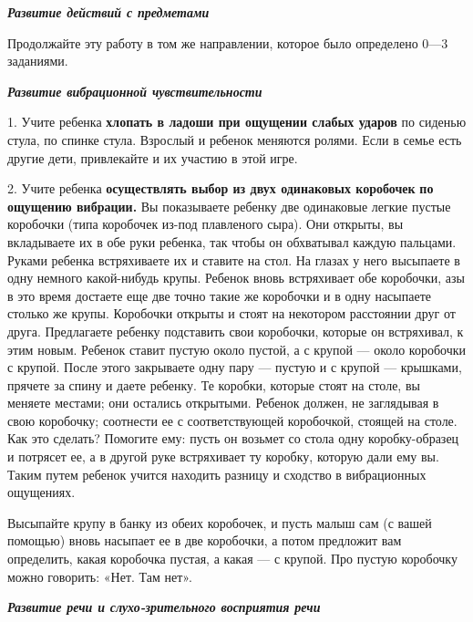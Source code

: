 \documentclass[a5paper]{book}
\renewcommand{\emph}[1]{\textit{#1}}
\begin{document}
\emph{\textbf{Развитие действий с предметами}}

Продолжайте эту работу в том же направлении, которое было определено
0---3 заданиями.

\textbf{\emph{Развитие вибрационной чувствительности}}

1. Учите ребенка \textbf{хлопать в ладоши при ощущении слабых ударов} по
сиденью стула, по спинке стула. Взрослый и ребенок меняются ролями. Если
в семье есть другие дети, привлекайте и их участию в этой игре.

2. Учите ребенка \textbf{осуществлять выбор из двух одинаковых
коробочек} \textbf{по ощущению вибрации.} Вы показываете ребенку две
одинаковые легкие пустые коробочки (типа коробочек из-под плавленого
сыра). Они открыты, вы вкладываете их в обе руки ребенка, так чтобы он
обхватывал каждую пальцами. Руками ребенка встряхиваете их и ставите на
стол. На глазах у него высыпаете в одну немного какой-нибудь крупы.
Ребенок вновь встряхивает обе коробочки, азы в это время достаете еще
две точно такие же коробочки и в одну насыпаете столько же крупы.
Коробочки открыты и стоят на некотором расстоянии друг от друга.
Предлагаете ребенку подставить свои коробочки, которые он встряхивал, к
этим новым. Ребенок ставит пустую около пустой, а с крупой --- около
коробочки с крупой. После этого закрываете одну пару --- пустую и с
крупой --- крышками, прячете за спину и даете ребенку. Те коробки,
которые стоят на столе, вы меняете местами; они остались открытыми.
Ребенок должен, не заглядывая в свою коробочку; соотнести ее с
соответствующей коробочкой, стоящей на столе. Как это сделать? Помогите
ему: пусть он возьмет со стола одну коробку-образец и потрясет ее, а в
другой руке встряхивает ту коробку, которую дали ему вы. Таким путем
ребенок учится находить разницу и сходство в вибрационных ощущениях.

Высыпайте крупу в банку из обеих коробочек, и пусть малыш сам (с вашей
помощью) вновь насыпает ее в две коробочки, а потом предложит вам
определить, какая коробочка пустая, а какая --- с крупой. Про пустую
коробочку можно говорить: «Нет. Там нет».

\emph{\textbf{Развитие речи и слухо-зрительного восприятия речи}}
\end{document}
